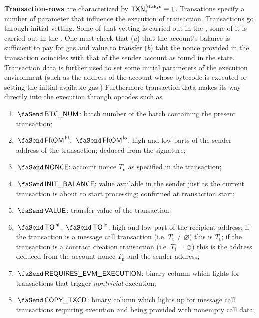 \textbf{Transaction-rows} are characterized by $\peekTransaction_{i} \equiv 1$.
Transations specify a number of parameter that influence the execution of transaction.
Transactions go through initial vetting.
Some of that vetting is carried out in the \hubMod{}, some of it is carried out in the \txnDataMod{}.
One must check that
(\emph{a}) that the account's balance is sufficient to pay for gas and value to transfer
(\emph{b}) taht the nonce provided in the transaction coincides with that of the sender account as found in the state.
Transaction data is further used to set some initial parameters of the execution environment (such as the address of the account whose bytecode is executed or setting the initial available gas.)
Furthermore transaction data makes its way directly into the execution through opcodes such as \inst{}
\begin{enumerate}
	\item $\txBatchNum$:
		\godGiven{}
		batch number of the batch containing the present transaction;
	\item $\txFrom\high$, $\txFrom\low$:
		\godGiven{}
		high and low parts of the sender address of the transaction; deduced from the signature;
	\item $\txNonce$:
		\godGiven{}
		account nonce $T_\text{n}$ as specified in the transaction;
	\item $\txInitialBalance$:
		\markAsJustifiedHere{}
		\godGiven{}
		value available in the sender just as the current transaction is about to start processing; confirmed at transaction start;
	\item $\txValue$:
		\godGiven{}
		transfer value of the transaction;
	\item $\txTo\high$, $\txTo\low$:
		\godGiven{}
		high and low part of the recipient address;
		if the transaction is a message call transaction (i.e. $T_{\text{t}} \neq \varnothing$) this is $T_{\text{t}}$;
		if the transaction is a contract creation transaction (i.e. $T_{\text{t}} = \varnothing$) this is the address deduced from the account nonce $T_\text{n}$ and the sender address;
	\item $\txRequiresEvmExecution$:
		\markAsPartiallyJustifiedHere{}
		\godGiven{}
		binary column which lights for transactions that trigger \emph{nontrivial} \evm{} execution;
	\item $\txCopyTxcd$:
		\godGiven{}
		binary column which lights up for message call transactions requiring \evm{} execution and being provided with nonempty call data;

\end{enumerate}
